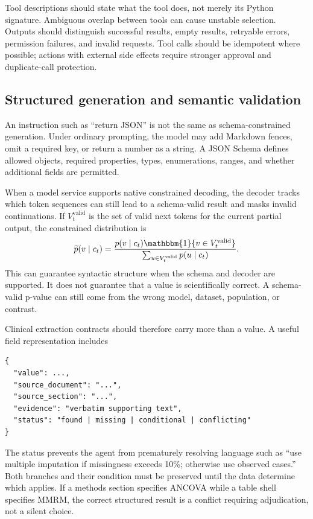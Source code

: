\documentclass[12pt,oneside]{book}
\numberwithin{equation}{section}
\theoremstyle{definition}
\theoremstyle{plain}
\theoremstyle{remark}
\newcommand{\ind}{\mathbbm{1}}
\begin{document}
Tool descriptions should state what the tool does, not merely its Python
signature.  Ambiguous overlap between tools can cause unstable selection.
Outputs should distinguish successful results, empty results, retryable errors,
permission failures, and invalid requests.  Tool calls should be idempotent
where possible; actions with external side effects require stronger approval
and duplicate-call protection.

\subsection{Structured generation and semantic validation}

An instruction such as ``return JSON'' is not the same as schema-constrained
generation.  Under ordinary prompting, the model may add Markdown fences,
omit a required key, or return a number as a string.  A JSON Schema defines
allowed objects, required properties, types, enumerations, ranges, and whether
additional fields are permitted.

When a model service supports native constrained decoding, the decoder tracks
which token sequences can still lead to a schema-valid result and masks invalid
continuations.  If $V_t^{\mathrm{valid}}$ is the set of valid next tokens for
the current partial output, the constrained distribution is
\[
 \widetilde p(v\mid c_t)
 =\frac{p(v\mid c_t)\ind\{v\in V_t^{\mathrm{valid}}\}}
 {\sum_{u\in V_t^{\mathrm{valid}}}p(u\mid c_t)}.
\]
This can guarantee syntactic structure when the schema and decoder are
supported.  It does not guarantee that a value is scientifically correct.  A
schema-valid p-value can still come from the wrong model, dataset, population,
or contrast.

Clinical extraction contracts should therefore carry more than a value.  A
useful field representation includes
\begin{lstlisting}[language={},numbers=none]
{
  "value": ...,
  "source_document": "...",
  "source_section": "...",
  "evidence": "verbatim supporting text",
  "status": "found | missing | conditional | conflicting"
}
\end{lstlisting}
The status prevents the agent from prematurely resolving language such as
``use multiple imputation if missingness exceeds 10\%; otherwise use observed
cases.''  Both branches and their condition must be preserved until the data
determine which applies.  If a methods section specifies ANCOVA while a table
shell specifies MMRM, the correct structured result is a conflict requiring
adjudication, not a silent choice.
\end{document}
